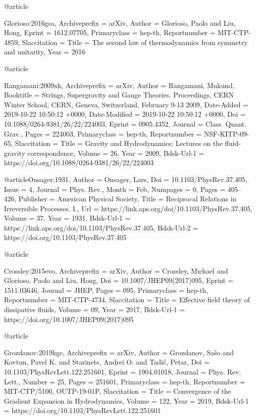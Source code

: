 \documentclass[superscriptaddress,prd,nofootinbib,preprintnumbers,longbibliography,11pt,eqsecnum]{revtex4-1}
\begin{document}
{{{{{{@article{Glorioso:2016gsa,
	Archiveprefix = {arXiv},
	Author = {Glorioso, Paolo and Liu, Hong},
	Eprint = {1612.07705},
	Primaryclass = {hep-th},
	Reportnumber = {MIT-CTP-4859},
	Slaccitation = {Title = {{The second law of thermodynamics from symmetry and unitarity}},
	Year = {2016}}

@article{Rangamani:2009xk,
	Archiveprefix = {arXiv},
	Author = {Rangamani, Mukund},
	Booktitle = {{Strings, Supergravity and Gauge Theories. Proceedings, CERN Winter School, CERN, Geneva, Switzerland, February 9-13 2009}},
	Date-Added = {2019-10-22 10:50:12 +0000},
	Date-Modified = {2019-10-22 10:50:12 +0000},
	Doi = {10.1088/0264-9381/26/22/224003},
	Eprint = {0905.4352},
	Journal = {Class. Quant. Grav.},
	Pages = {224003},
	Primaryclass = {hep-th},
	Reportnumber = {NSF-KITP-09-65},
	Slaccitation = {Title = {{Gravity and Hydrodynamics: Lectures on the fluid-gravity correspondence}},
	Volume = {26},
	Year = {2009},
	Bdsk-Url-1 = {https://doi.org/10.1088/0264-9381/26/22/224003}}

@article{Onsager:1931,
	Author = {Onsager, Lars},
	Doi = {10.1103/PhysRev.37.405},
	Issue = {4},
	Journal = {Phys. Rev.},
	Month = {Feb},
	Numpages = {0},
	Pages = {405--426},
	Publisher = {American Physical Society},
	Title = {Reciprocal Relations in Irreversible Processes. I.},
	Url = {https://link.aps.org/doi/10.1103/PhysRev.37.405},
	Volume = {37},
	Year = {1931},
	Bdsk-Url-1 = {https://link.aps.org/doi/10.1103/PhysRev.37.405},
	Bdsk-Url-2 = {https://doi.org/10.1103/PhysRev.37.405}}

@article{Crossley:2015evo,
	Archiveprefix = {arXiv},
	Author = {Crossley, Michael and Glorioso, Paolo and Liu, Hong},
	Doi = {10.1007/JHEP09(2017)095},
	Eprint = {1511.03646},
	Journal = {JHEP},
	Pages = {095},
	Primaryclass = {hep-th},
	Reportnumber = {MIT-CTP-4734},
	Slaccitation = {Title = {{Effective field theory of dissipative fluids}},
	Volume = {09},
	Year = {2017},
	Bdsk-Url-1 = {https://doi.org/10.1007/JHEP09(2017)095}}

@article{Grozdanov:2019kge,
	Archiveprefix = {arXiv},
	Author = {Grozdanov, Sa{\v s}o and Kovtun, Pavel K. and Starinets, Andrei O. and Tadi{\'c}, Petar},
	Doi = {10.1103/PhysRevLett.122.251601},
	Eprint = {1904.01018},
	Journal = {Phys. Rev. Lett.},
	Number = {25},
	Pages = {251601},
	Primaryclass = {hep-th},
	Reportnumber = {MIT-CTP/5100, OUTP-19-01P},
	Slaccitation = {Title = {{Convergence of the Gradient Expansion in Hydrodynamics}},
	Volume = {122},
	Year = {2019},
	Bdsk-Url-1 = {https://doi.org/10.1103/PhysRevLett.122.251601}}

}}}}}}}}}}
\end{document}
